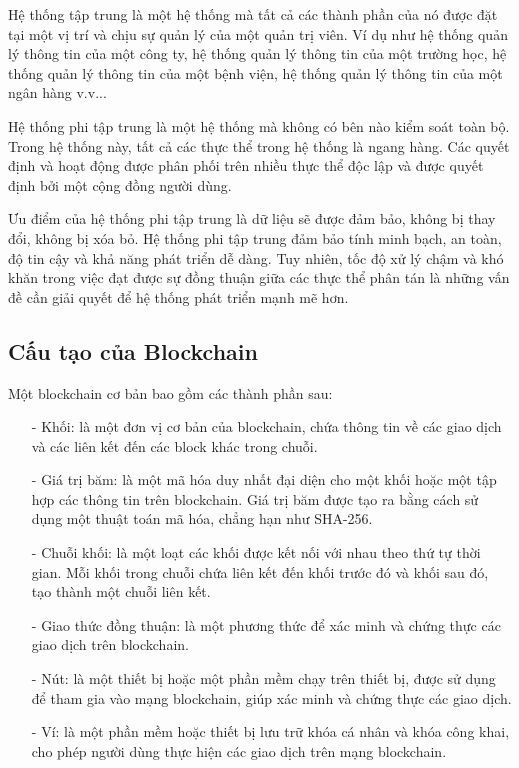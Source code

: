 Hệ thống tập trung là một hệ thống mà tất cả các thành phần của nó
được đặt tại một vị trí và chịu sự quản lý của một quản trị viên.
Ví dụ như hệ thống quản lý thông tin của một công ty, hệ thống
quản lý thông tin của một trường học, hệ thống quản lý thông tin
của một bệnh viện, hệ thống quản lý thông tin của một ngân hàng
v.v...

Hệ thống phi tập trung là một hệ thống mà không có bên nào kiểm soát 
toàn bộ. Trong hệ thống này, tất cả các thực thể trong hệ thống là 
ngang hàng. Các quyết định và hoạt động được phân phối trên nhiều 
thực thể độc lập và được quyết định bởi một cộng đồng người dùng.

Ưu điểm của hệ thống phi tập trung là dữ liệu sẽ được đảm bảo, 
không bị thay đổi, không bị xóa bỏ. Hệ thống phi tập trung đảm bảo
tính minh bạch, an toàn, độ tin cậy và khả năng phát triển dễ dàng.
Tuy nhiên, tốc độ xử lý chậm và khó khăn trong việc đạt được sự đồng
thuận giữa các thực thể phân tán là những vấn đề cần giải quyết để 
hệ thống phát triển mạnh mẽ hơn.

\subsection{Cấu tạo của Blockchain}

Một blockchain cơ bản bao gồm các thành phần sau:
\begin{itemize}
    \item[-] Khối: là một đơn vị cơ bản của blockchain, chứa thông tin về các giao dịch và các liên kết đến các block khác trong chuỗi.
    \item[-] Giá trị băm: là một mã hóa duy nhất đại diện cho một khối hoặc một tập hợp các thông tin trên blockchain. Giá trị băm được tạo ra bằng cách sử dụng một thuật toán mã hóa, chẳng hạn như SHA-256.
    \item[-] Chuỗi khối: là một loạt các khối được kết nối với nhau theo thứ tự thời gian. Mỗi khối trong chuỗi chứa liên kết đến khối trước đó và khối sau đó, tạo thành một chuỗi liên kết.
    \item[-] Giao thức đồng thuận: là một phương thức để xác minh và chứng thực các giao dịch trên blockchain. 
    \item[-] Nút: là một thiết bị hoặc một phần mềm chạy trên thiết bị, được sử dụng để tham gia vào mạng blockchain, giúp xác minh và chứng thực các giao dịch.
    \item[-] Ví: là một phần mềm hoặc thiết bị lưu trữ khóa cá nhân và khóa công khai, cho phép người dùng thực hiện các giao dịch trên mạng blockchain.

\end{itemize}

